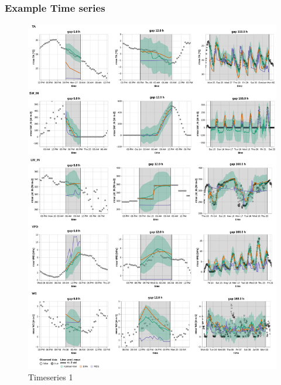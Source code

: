 \documentclass{article}
\newcommand{\imgwidth}{6in}
\begin{document}





\subsubsection{Example Time series}

\begin{figure}
\centerline{\includegraphics[width=\imgwidth]{timeseries_1}}
\caption{Timeseries 1}
\label{fig:ts_1_1}
\end{figure}
\restoregeometry
\end{document}
